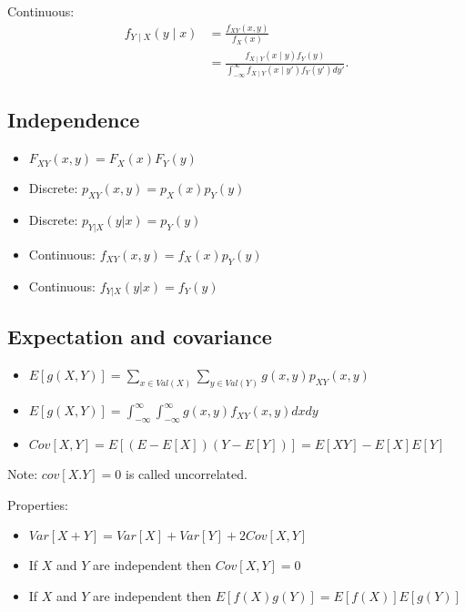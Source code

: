 \documentclass{article}
\begin{document}
    Continuous:
    \begin{align}
        f_{Y \mid X}(y\mid x) & = \frac{f_{XY}(x, y)}{f_X(x)} \\ 
        & = \frac{f_{X \mid Y} (x \mid y) f_Y(y)}{\int^{\infty}_{- \infty} f_{X\mid Y} (x \mid y') f_Y (y') dy'}.
    \end{align}

    \subsection{Independence}
    \begin{itemize}
        \item $F_{XY}(x,y) = F_X(x)F_Y(y)$
        \item Discrete: $p_{XY}(x,y) = p_X(x)p_Y(y)$
        \item Discrete: $p_{Y|X}(y|x) = p_Y(y)$
        \item Continuous: $f_{XY}(x,y) = f_X(x)p_Y(y)$
        \item Continuous: $f_{Y|X}(y|x) = f_Y(y)$
    \end{itemize}

    \subsection{Expectation and covariance}
    \begin{itemize}
        \item $E[g(X,Y)] = \sum_{x \in Val(X)} \sum_{y \in Val(Y)} g(x, y)p_{XY}(x, y)$
        \item $E[g(X, Y)] = \int^{\infty}_{-\infty} \int^{\infty}_{-\infty} g(x, y)f_{XY}(x, y)dxdy$
        \item $Cov[X,Y] = E[(E-E[X])(Y-E[Y])] = E[XY]-E[X]E[Y]$
    \end{itemize}
    Note: $cov[X.Y] = 0$ is called uncorrelated.

    Properties:
    \begin{itemize}
        \item $Var[X+Y] = Var[X]+Var[Y]+2Cov[X, Y]$
        \item If $X$ and $Y$ are independent then $Cov[X,Y]=0$
        \item If $X$ and $Y$ are independent then $E[f(X)g(Y)] = E[f(X)]E[g(Y)]$
    \end{itemize}

\printbibliography[title={Referências}]
\end{document}

